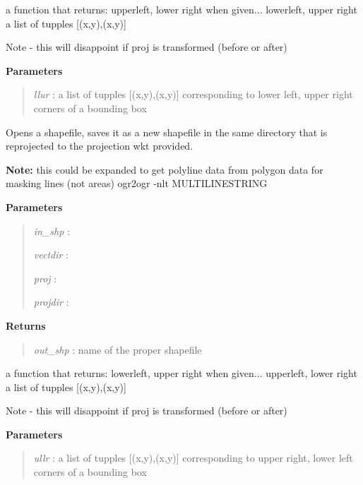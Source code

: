 \documentclass[letterpaper,10pt,openany,oneside]{sphinxmanual}
\begin{document}

\begin{fulllineitems}
\label{code:Util.llur2ullr}
a function that returns:
upperleft, lower right when given...
lowerleft, upper right
a list of tupples {[}(x,y),(x,y){]}

Note - this will disappoint if proj is transformed (before or after)

\textbf{Parameters}
\begin{quote}

\emph{llur} : a list of tupples {[}(x,y),(x,y){]} corresponding to lower left, upper right corners of a bounding box
\end{quote}

\end{fulllineitems}


\begin{fulllineitems}
\label{code:Util.reprojSHP}
Opens a shapefile, saves it as a new shapefile in the same directory
that is reprojected to the projection wkt provided.

\textbf{Note:} this could be expanded to get polyline data from polygon data
for masking lines (not areas) ogr2ogr -nlt MULTILINESTRING

\textbf{Parameters}
\begin{quote}

\emph{in\_shp}  :

\emph{vectdir} :

\emph{proj}    :

\emph{projdir} :
\end{quote}

\textbf{Returns}
\begin{quote}

\emph{out\_shp} : name of the proper shapefile
\end{quote}

\end{fulllineitems}


\begin{fulllineitems}
\label{code:Util.ullr2llur}
a function that returns:
lowerleft, upper right when given...
upperleft, lower right
a list of tupples {[}(x,y),(x,y){]}

Note - this will disappoint if proj is transformed (before or after)

\textbf{Parameters}
\begin{quote}

\emph{ullr} : a list of tupples {[}(x,y),(x,y){]} corresponding to upper right, lower left corners of a bounding box
\end{quote}

\end{fulllineitems}
\end{document}
